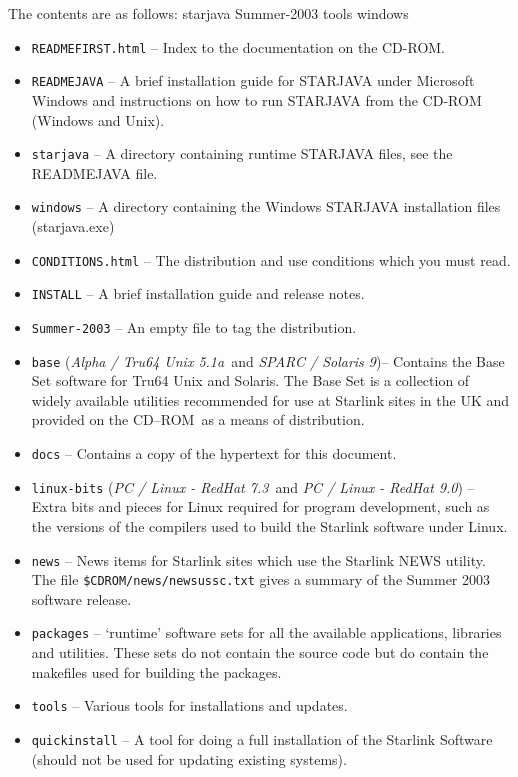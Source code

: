 \documentclass[twoside,11pt]{article}
\renewcommand{\_}{\texttt{\symbol{95}}}
\newcommand{\cdrom}{CD--ROM}
\newcommand{\cdrom}{CD-ROM}
\newcommand{\axp}{\textit{Alpha / Tru64 Unix 5.1a}}
\newcommand{\rha}{\textit{PC / Linux - RedHat 7.3}}
\newcommand{\rhb}{\textit{PC / Linux - RedHat 9.0}}
\newcommand{\sol}{\textit{SPARC / Solaris 9}}
\begin{document}
The contents are as follows:
starjava  Summer-2003  tools  windows
\begin{itemize}

\item \texttt{README\_FIRST.html} -- Index to the documentation on the CD-ROM.

\item \texttt{README\_JAVA} -- A brief installation guide for STARJAVA under
                               Microsoft Windows and instructions on how to
                               run STARJAVA from the CD-ROM (Windows and Unix).

\item \texttt{starjava} -- A directory containing runtime STARJAVA files, see
                           the README\_JAVA file.

\item \texttt{windows} -- A directory containing the Windows STARJAVA installation
                          files (starjava.exe)

\item \texttt{CONDITIONS.html} -- The distribution and use conditions which
you must read.

\item \texttt{INSTALL} -- A brief installation guide and release notes.

\item \texttt{Summer-2003} -- An empty file to tag the distribution.

\item \texttt{base} (\axp\ and \sol)-- Contains the Base Set software
for Tru64 Unix and Solaris.  The Base Set is a collection of widely
available utilities recommended for use at Starlink sites in the UK and
provided on the \cdrom\ as a means of distribution.

\item \texttt{docs} -- Contains a copy of the hypertext for this document.

\item \texttt{linux-bits} (\rha\ and \rhb) -- Extra bits and pieces
for Linux required for program development, such as the versions of the
compilers used to build the Starlink software under Linux.

\item \texttt{news} -- News items for Starlink sites which use the
Starlink NEWS utility.  The file \texttt{\$CDROM/news/news\_ussc.txt}
gives a summary of the Summer 2003 software release.

\item \texttt{packages} -- `runtime' software sets for all the
available applications, libraries and utilities.  These sets do not
contain the source code but do contain the makefiles used for building
the packages.

\item \texttt{tools} -- Various tools for installations and updates.


\item \texttt{quick\_install} -- A tool for doing a full installation of the
Starlink Software (should not be used for updating existing systems).

\end{itemize}
\end{document}
